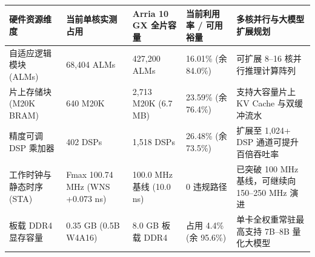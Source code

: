 \documentclass[11pt,a4paper]{article}
\begin{document}
{\footnotesize\renewcommand{\arraystretch}{1.14}\begin{longtable}{@{}L{0.19\textwidth}L{0.16\textwidth}L{0.16\textwidth}L{0.15\textwidth}L{0.24\textwidth}@{}}\toprule

\textbf{硬件资源维度} & \textbf{当前单核实测占用} & \textbf{Arria 10 GX 全片容量} & \textbf{当前利用率 /\allowbreak{} 可用裕量} & \textbf{多核并行与大模型扩展规划}\\\midrule\endhead

自适应逻辑模块 (\allowbreak{}ALMs)\allowbreak{} & 68,\allowbreak{}404 ALMs & 427,\allowbreak{}200 ALMs & 16.01\% (\allowbreak{}余 84.0\%)\allowbreak{} & 可扩展 8–16 核并行推理计算阵列\\[2pt]

片上存储块 (\allowbreak{}M20K BRAM)\allowbreak{} & 640 M20K & 2,\allowbreak{}713 M20K (\allowbreak{}6.7 MB)\allowbreak{} & 23.59\% (\allowbreak{}余 76.4\%)\allowbreak{} & 支持大容量片上 KV Cache 与双缓冲流水\\[2pt]

精度可调 DSP 乘加器 & 402 DSPs & 1,\allowbreak{}518 DSPs & 26.48\% (\allowbreak{}余 73.5\%)\allowbreak{} & 扩展至 1,\allowbreak{}024+\allowbreak{} DSP 通道可提升百倍吞吐率\\[2pt]

工作时钟与静态时序 (\allowbreak{}STA)\allowbreak{} & Fmax 100.74 MHz (\allowbreak{}WNS +\allowbreak{}0.073 ns)\allowbreak{} & 100.0 MHz 基线 (\allowbreak{}10.0 ns)\allowbreak{} & 0 违规路径 & 已突破 100 MHz 基线，可继续向 150–250 MHz 演进\\[2pt]

板载 DDR4 显存容量 & 0.35 GB (\allowbreak{}0.5B W4A16)\allowbreak{} & 8.0 GB 板载 DDR4 & 占用 4.4\% (\allowbreak{}余 95.6\%)\allowbreak{} & 单卡全权重常驻最高支持 7B–8B 量化大模型\\[2pt]

\bottomrule\end{longtable}}
\end{document}
